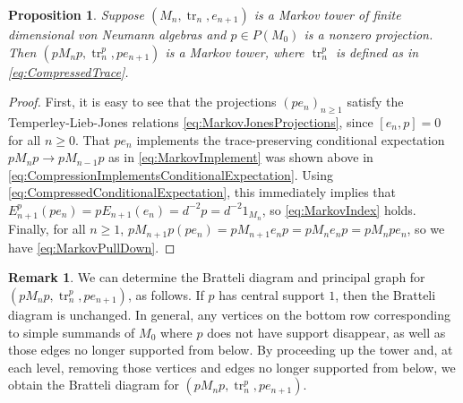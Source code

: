 \documentclass[11pt]{article}
\theoremstyle{plain}
\newtheorem{prop}[thm]{Proposition}
\theoremstyle{definition}
\newtheorem{remark}[thm]{Remark}
\DeclareMathOperator{\tr}{tr}
\begin{document}
\begin{prop}
Suppose $(M_n,\tr_n, e_{n+1})$ is a Markov tower of finite dimensional von Neumann algebras and $p\in P(M_0)$ is a nonzero projection.
Then $(pM_np, \tr_n^p, pe_{n+1})$ is a Markov tower, where $\tr_n^p$ is defined as in \eqref{eq:CompressedTrace}.
\end{prop}
\begin{proof}
First, it is easy to see that the projections $(pe_n)_{n\geq 1}$ satisfy the Temperley-Lieb-Jones relations \ref{eq:MarkovJonesProjections}, since $[e_n,p]=0$ for all $n\geq 0$.
That $pe_n$ implements the trace-preserving conditional expectation $pM_np \to pM_{n-1}p$ as in \ref{eq:MarkovImplement} was shown above in \eqref{eq:CompressionImplementsConditionalExpectation}.
Using \eqref{eq:CompressedConditionalExpectation}, this immediately implies that $E_{n+1}^p(pe_n) = pE_{n+1}(e_n) = d^{-2}p = d^{-2} 1_{M_n}$, so \ref{eq:MarkovIndex} holds.
Finally, for all $n\geq 1$, $pM_{n+1}p (pe_n) = pM_{n+1}e_np = pM_ne_np = pM_npe_n$, so we have \ref{eq:MarkovPullDown}.
\end{proof}

\begin{remark}
 \label{Rem:CompressionTowerEffects}
We can determine the Bratteli diagram and principal graph for $(pM_np, \tr_n^p, pe_{n+1})$, as follows. 
If $p$ has central support $1$, then the Bratteli diagram is unchanged. 
In general, any vertices on the bottom row corresponding to simple summands of $M_0$ where $p$ does not have support disappear, as well as those edges no longer supported from below. 
By proceeding up the tower and, at each level, removing those vertices and edges no longer supported from below, we obtain the Bratteli diagram for $(pM_np, \tr_n^p, pe_{n+1})$.
\end{remark}
\end{document}
